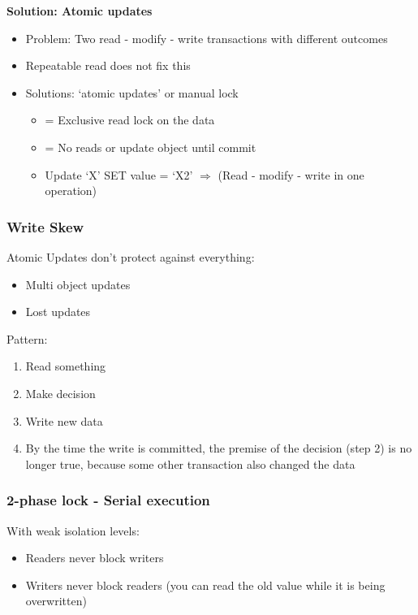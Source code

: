 \documentclass{article}
\begin{document}
\textbf{Solution: Atomic updates}

\begin{itemize}
    \item Problem: Two read - modify - write transactions with different outcomes
    \item Repeatable read does not fix this
    \item Solutions: `atomic updates' or manual lock
    \begin{itemize}
        \item = Exclusive read lock on the data
        \item = No reads or update object until commit
        \item Update `X' SET value = `X2' $\Rightarrow$ (Read - modify - write in one operation)
    \end{itemize}
\end{itemize}

\subsubsection{Write Skew}

Atomic Updates don't protect against everything:

\begin{itemize}
    \item Multi object updates
    \item Lost updates
\end{itemize}

Pattern:

\begin{enumerate}
    \item Read something
    \item Make decision
    \item Write new data
    \item By the time the write is committed, the premise of the decision (step 2) is no longer true, because some other transaction also changed the data
\end{enumerate}

\subsubsection{2-phase lock - Serial execution}

With weak isolation levels:

\begin{itemize}
    \item Readers never block writers
    \item Writers never block readers (you can read the old value while it is being overwritten)
\end{itemize}
\end{document}
